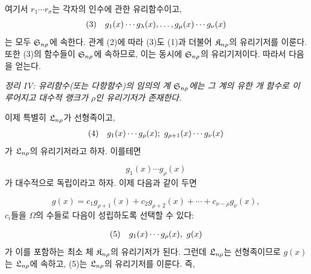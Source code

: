 여기서 $r_1\cdots r_\sigma$는 각자의 인수에 관한 유리함수이고,
\[
\begin{array}{@{}l@{\quad}c@{}}
(3)&g_1(x)\cdots g_\lambda(x),\ldots,g_\mu(x)\cdots g_\nu(x)
\end{array}
\]
는 모두 $\mathfrak S_{n\rho}$에 속한다. 관계 (2)에 따라 (3)도 (1)과 더불어 $\mathfrak K_{n\rho}$의 유리기저를 이룬다. 또한 (3)의 함수들이 $\mathfrak S_{n\rho}$에 속하므로, 이는 동시에 $\mathfrak S_{n\rho}$의 유리기저이다. 따라서 다음을 얻는다.

\emph{정리 IV: 유리함수(또는 다항함수)의 임의의 계 $\mathfrak S_{n\rho}$에는 그 계의 유한 개 함수로 이루어지고 대수적 랭크가 $\rho$인 유리기저가 존재한다.}

이제 특별히 $\mathfrak L_{n\rho}$가 선형족이고,
\[
\begin{array}{@{}l@{\quad}c@{}}
(4)&g_1(x)\cdots g_\rho(x);\ g_{\rho+1}(x)\cdots g_\nu(x)
\end{array}
\]
가 $\mathfrak L_{n\rho}$의 유리기저라고 하자. 이를테면

\[
g_1(x)\cdots g_\rho(x)
\]
가 대수적으로 독립이라고 하자. 이제 다음과 같이 두면

\[
g(x)=c_1g_{\rho+1}(x)+c_2g_{\rho+2}(x)+\cdots+c_{\nu-\rho}g_\nu(x),
\]
$c_i$들을 $\Omega$의 수들로 다음이 성립하도록 선택할 수 있다:

\[
\begin{array}{@{}l@{\quad}c@{}}
(5)&g_1(x)\cdots g_\rho(x),\ g(x)
\end{array}
\]
가 이를 포함하는 최소 체 $\mathfrak K_{n\rho}$의 유리기저가 된다. 그런데 $\mathfrak L_{n\rho}$는 선형족이므로 $g(x)$는 $\mathfrak L_{n\rho}$에 속하고, (5)는 $\mathfrak L_{n\rho}$의 유리기저를 이룬다. 즉,

